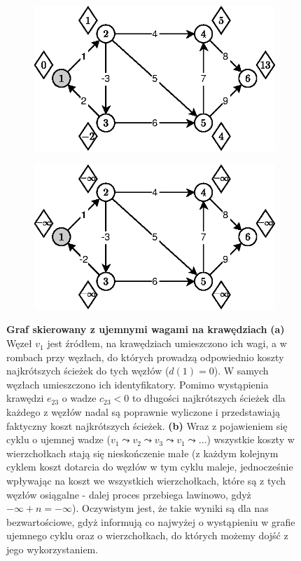\begin{figure}[!htbp]
	\centering
	\begin{subfigure}[b]{0.45\textwidth}
		\includegraphics[width=\textwidth]{Chapter_I/8/1_8a.eps}
		\caption{}
	\end{subfigure}%
	\qquad
	\begin{subfigure}[b]{0.45\textwidth}
		\includegraphics[width=\textwidth]{Chapter_I/8/1_8b.eps}
		\caption{}
	\end{subfigure}
	\caption{\textbf{Graf skierowany z ujemnymi wagami na krawędziach} \textbf{(a)} Węzeł $v_{1}$ jest źródłem, na krawędziach umieszczono ich wagi, a w rombach przy węzłach, do których prowadzą odpowiednio koszty najkrótszych ścieżek do tych węzłów ($d \left( 1 \right) = 0$). W samych węzłach umieszczono ich identyfikatory. Pomimo wystąpienia krawędzi $e_{23}$ o wadze $c_{23} < 0$ to długości najkrótszych ścieżek dla każdego z węzłów nadal są poprawnie wyliczone i przedstawiają faktyczny koszt najkrótszych ścieżek. \textbf{(b)} Wraz z pojawieniem się cyklu o ujemnej wadze ($v_{1} \leadsto v_{2} \leadsto v_{3} \leadsto v_{1} \leadsto \ldots$) wszystkie koszty w wierzchołkach stają się nieskończenie małe (z każdym kolejnym cyklem koszt dotarcia do węzłów w tym cyklu maleje, jednocześnie wpływając na koszt we wszystkich wierzchołkach, które są z tych węzłów osiągalne - dalej proces przebiega lawinowo, gdyż $- \infty + n = - \infty$). Oczywistym jest, że takie wyniki są dla nas bezwartościowe, gdyż informują co najwyżej o wystąpieniu w grafie ujemnego cyklu oraz o wierzchołkach, do których możemy dojść z jego wykorzystaniem.}\label{fig:negativeCycle}
\end{figure}

